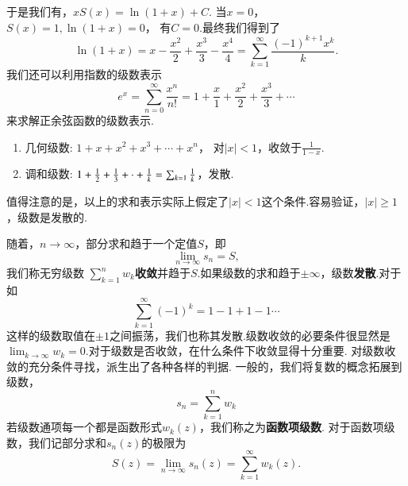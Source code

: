 于是我们有，$
    x S(x) = \ln (1 + x) + C .$
当$x=0$， $S(x) = 1, \ln (1+x) = 0$， 有$C=0$.最终我们得到了
\begin{equation}
    \ln (1+x) = x -  \frac{x^2}{2} + \frac{x^3}{3} - \frac{x^4}{4} = \sum_{k=1}^{\infty} \frac{(-1)^{k+1} x^k}{k} .
\end{equation}
我们还可以利用指数的级数表示
\begin{equation}
    e^{x} = \sum_{n=0}^{\infty} \frac{x^n}{n!} = 1 + \frac{x}{1} + \frac{x^2}{2} + \frac{x^3}{3} + \cdots 
\end{equation}
来求解正余弦函数的级数表示.
\begin{enumerate}
    \item 几何级数: $ 1 + x + x^2 + x^3 + \cdots + x^n$， 对$|x|<1$，收敛于$\frac{1}{1-x}$.
    \item 调和级数: $ 1 + {\frac{1}{2}} + \frac{1}{3} + \cdot +\frac{1}{k} = \sum_{k=1} \frac{1}{k}$，发散.
\end{enumerate}

值得注意的是，以上的求和表示实际上假定了$|x|<1$这个条件.容易验证，$|x|\geq 1$，级数是发散的.

随着，$n\to \infty$，部分求和趋于一个定值$S$，即
\begin{equation}
    \lim_{n\to \infty} s_n = S ,
\end{equation}
我们称无穷级数 $\sum_{k=1}^{n} w_{k}${\bf 收敛}并趋于$S$.如果级数的求和趋于$\pm \infty$，级数{\bf 发散}.对于如
\begin{equation}
    \sum_{k=1}^{\infty} (-1)^k = 1 - 1 + 1 - 1 \cdots 
\end{equation}
这样的级数取值在$\pm 1$之间振荡，我们也称其发散.级数收敛的必要条件很显然是$\lim_{k\to \infty} w_k = 0$.对于级数是否收敛，在什么条件下收敛显得十分重要.
对级数收敛的充分条件寻找，派生出了各种各样的判据.
一般的，我们将复数的概念拓展到级数，
\begin{equation}
    s_n = \sum_{k=1}^{n} w_{k}
\end{equation}
若级数通项每一个都是函数形式$w_k(z)$，我们称之为\textbf{函数项级数}.
对于函数项级数，我们记部分求和$s_n(z)$的极限为
\begin{equation}
    S(z) = \lim_{n\to \infty} s_n(z) =  \sum_{k=1}^{\infty} w_k (z). 
\end{equation}


